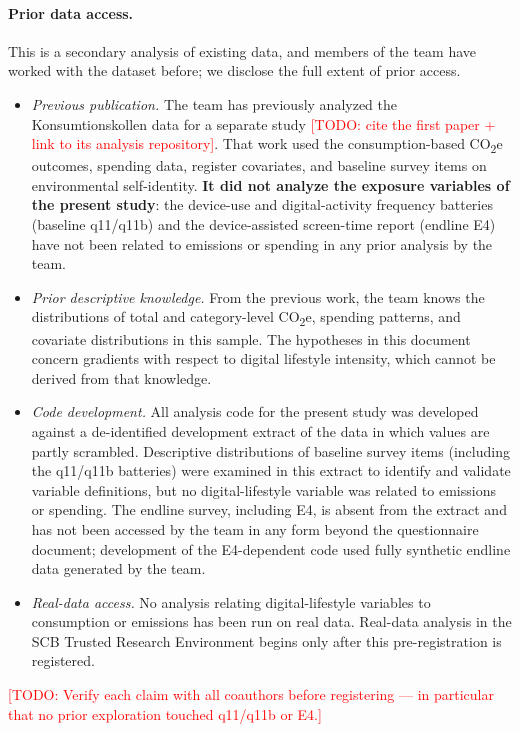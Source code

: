 \documentclass[11pt,a4paper]{article}
\newcommand{\todo}[1]{\textcolor{red}{[TODO: #1]}}
\begin{document}
\paragraph{Prior data access.} This is a secondary analysis of existing data,
and members of the team have worked with the dataset before; we disclose the
full extent of prior access.
\begin{itemize}
  \item \emph{Previous publication.} The team has previously analyzed the
    Konsumtionskollen data for a separate study \todo{cite the first paper +
    link to its analysis repository}. That work used the consumption-based
    CO\textsubscript{2}e outcomes, spending data, register covariates, and
    baseline survey items on environmental self-identity. \textbf{It did not
    analyze the exposure variables of the present study}: the device-use and
    digital-activity frequency batteries (baseline q11/q11b) and the
    device-assisted screen-time report (endline E4) have not been related to
    emissions or spending in any prior analysis by the team.
  \item \emph{Prior descriptive knowledge.} From the previous work, the team
    knows the distributions of total and category-level CO\textsubscript{2}e,
    spending patterns, and covariate distributions in this sample. The
    hypotheses in this document concern gradients with respect to digital
    lifestyle intensity, which cannot be derived from that knowledge.
  \item \emph{Code development.} All analysis code for the present study was
    developed against a de-identified development extract of the data in which
    values are partly scrambled. Descriptive distributions of baseline survey
    items (including the q11/q11b batteries) were examined in this extract to
    identify and validate variable definitions, but no digital-lifestyle
    variable was related to emissions or spending. The endline survey,
    including E4, is absent from the extract and has not been accessed by the
    team in any form beyond the questionnaire document; development of the
    E4-dependent code used fully synthetic endline data generated by the team.
  \item \emph{Real-data access.} No analysis relating digital-lifestyle
    variables to consumption or emissions has been run on real data. Real-data
    analysis in the SCB Trusted Research Environment begins only after this
    pre-registration is registered.
\end{itemize}
\todo{Verify each claim with all coauthors before registering --- in
particular that no prior exploration touched q11/q11b or E4.}
\end{document}
